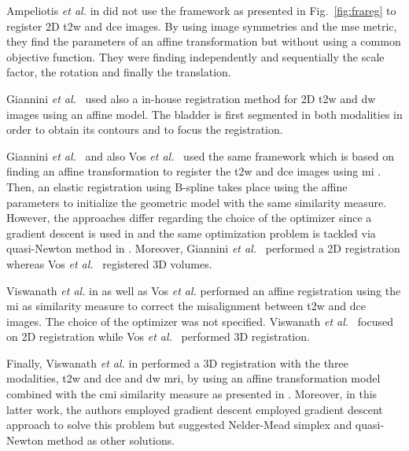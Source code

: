 Ampeliotis \textit{et al.} in \cite{Ampeliotis2007,Ampeliotis2008} did not use the framework as presented in Fig.~\ref{fig:frareg} to register 2D \ac{t2w} and \ac{dce} images.
By using image symmetries and the \ac{mse} metric, they find the parameters of an affine transformation but without using a common objective function.
They were finding independently and sequentially the scale factor, the rotation and finally the translation.

Giannini \textit{et al.}~\cite{Giannini2013} used also a in-house registration method for 2D \ac{t2w} and \ac{dw} images using an affine model.
The bladder is first segmented in both modalities in order to obtain its contours and to focus the registration.

Giannini \textit{et al.}~\cite{Giannini2013} and also Vos \textit{et al.}~\cite{Vos2010} used the same framework which is based on finding an affine transformation to register the \ac{t2w} and \ac{dce} images using \ac{mi} \cite{Rueckert1999}.
Then, an elastic registration using B-spline takes place using the affine parameters to initialize the geometric model with the same similarity measure.
However, the approaches differ regarding the choice of the optimizer since a gradient descent is used in \cite{Giannini2013} and the same optimization problem is tackled via quasi-Newton method in \cite{Vos2010}.
Moreover, Giannini \textit{et al.}~\cite{Giannini2013} performed a 2D registration whereas Vos \textit{et al.}~\cite{Vos2010} registered 3D volumes.

Viswanath \textit{et al.} in \cite{Viswanath2008a,Viswanath2009} as well as Vos \textit{et al.} \cite{Vos2008} performed an affine registration using the \ac{mi} as similarity measure to correct the misalignment between \ac{t2w} and \ac{dce} images.
The choice of the optimizer was not specified. 
Viswanath \textit{et al.}~\cite{Viswanath2008a,Viswanath2009} focused on 2D registration while Vos \textit{et al.}~\cite{Vos2008} performed 3D registration.

Finally, Viswanath \textit{et al.} in \cite{Viswanath2011} performed a 3D registration with the three modalities, \ac{t2w} and \ac{dce} and \ac{dw} \ac{mri}, by using an affine transformation model combined with the \ac{cmi} similarity measure as presented in \cite{Chappelow2011}.
Moreover, in this latter work, the authors employed gradient descent \cite{Chappelow2011} employed gradient descent approach to solve this problem but suggested Nelder-Mead simplex and quasi-Newton method as other solutions.

